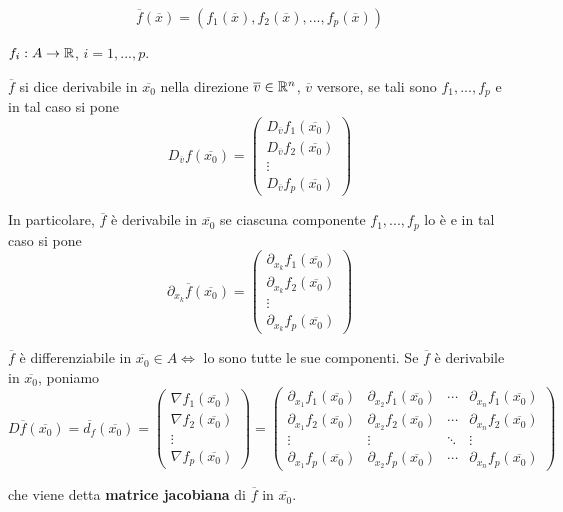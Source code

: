 $$\overline{f}(\overline{x})=(f_1(\overline{x}),f_2(\overline{x}),...,f_p(\overline{x}))$$

$f_i:A \rightarrow \mathbb{R}$, $ i =1,...,p$.


\begin{definition}
	$\overline{f}$ si dice derivabile in $\overline{x_0}$ nella direzione $\overline{v}\in \mathbb{R}^n$, $\overline{v}$ versore, se tali sono $f_1,...,f_p$ e in tal caso si pone
	\begin{equation*}
		D_{\overline{v}}f(\overline{x_0})=
		\begin{pmatrix}
			D_{\overline{v}}f_1(\overline{x_0})\\
			D_{\overline{v}}f_2(\overline{x_0})\\
			\vdots\\
			D_{\overline{v}}f_p(\overline{x_0})
		\end{pmatrix}
	\end{equation*}
	
	In particolare, $\overline{f}$ è derivabile in $\overline{x_0}$ se ciascuna componente $f_1,...,f_p$ lo è e in tal caso si pone 
	\begin{equation*}
		\partial_{x_k}\overline{f}(\overline{x_0})=
		\begin{pmatrix}
			\partial_{x_k}f_1(\overline{x_0})\\
			\partial_{x_k}f_2(\overline{x_0})\\
			\vdots\\
			\partial_{x_k}f_p(\overline{x_0})
		\end{pmatrix}
	\end{equation*}
\end{definition}


\begin{definition}
	$\overline{f}$ è differenziabile in $\overline{x_0}\in A  \Leftrightarrow$ lo sono tutte le sue componenti. Se $\overline{f}$ è derivabile in $\overline{x_0}$, poniamo 
	\begin{equation*}
		D\overline{f}(\overline{x_0})=\overline{d_f}(\overline{x_0})=
		\begin{pmatrix}
			\nabla f_1(\overline{x_0})\\
			\nabla f_2(\overline{x_0})\\
			\vdots\\
			\nabla f_p(\overline{x_0})
		\end{pmatrix}=
		\begin{pmatrix}
			\partial_{x_1}f_1(\overline{x_0})&\partial_{x_2}f_1(\overline{x_0})&\cdots&\partial_{x_n}f_1(\overline{x_0})\\
			\partial_{x_1}f_2(\overline{x_0})&\partial_{x_2}f_2(\overline{x_0})&\cdots&\partial_{x_n}f_2(\overline{x_0})\\
			\vdots&\vdots&\ddots&\vdots \\
			\partial_{x_1}f_p(\overline{x_0})&\partial_{x_2}f_p(\overline{x_0})&\cdots&\partial_{x_n}f_p(\overline{x_0})
		\end{pmatrix}
	\end{equation*}
	
	che viene detta \textbf{matrice jacobiana} di $\overline{f}$ in $\overline{x_0}$.
\end{definition}


